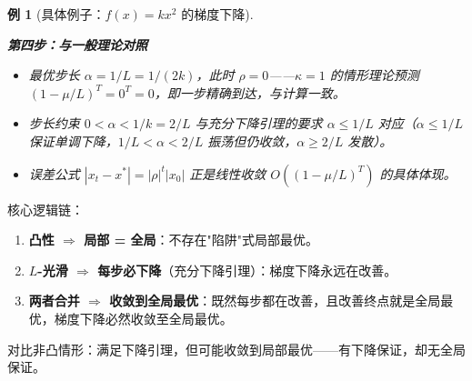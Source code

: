 \documentclass[12pt, a4paper]{ctexart}
\newtheorem{example}[theorem]{例}
\begin{document}
\begin{example}[具体例子：$f(x) = kx^2$ 的梯度下降]
\begin{center}
\end{center}

\textbf{第四步：与一般理论对照}

\begin{itemize}
    \item 最优步长 $\alpha = 1/L = 1/(2k)$，此时 $\rho = 0$——$\kappa = 1$ 的情形理论预测 $(1-\mu/L)^T = 0^T = 0$，即一步精确到达，与计算一致。
    \item 步长约束 $0 < \alpha < 1/k = 2/L$ 与充分下降引理的要求 $\alpha \leq 1/L$ 对应（$\alpha \leq 1/L$ 保证单调下降，$1/L < \alpha < 2/L$ 振荡但仍收敛，$\alpha \geq 2/L$ 发散）。
    \item 误差公式 $|x_t - x^*| = |\rho|^t |x_0|$ 正是线性收敛 $O((1-\mu/L)^T)$ 的具体体现。
\end{itemize}

\end{example}

\begin{insight}[为什么凸性保证梯度下降找到最优解？]

核心逻辑链：

\begin{enumerate}
    \item \textbf{凸性 $\Rightarrow$ 局部 = 全局}：不存在"陷阱"式局部最优。
    \item \textbf{$L$-光滑 $\Rightarrow$ 每步必下降}（充分下降引理）：梯度下降永远在改善。
    \item \textbf{两者合并 $\Rightarrow$ 收敛到全局最优}：既然每步都在改善，且改善终点就是全局最优，梯度下降必然收敛至全局最优。
\end{enumerate}

对比非凸情形：满足下降引理，但可能收敛到局部最优——有下降保证，却无全局保证。

\end{insight}
\end{document}
